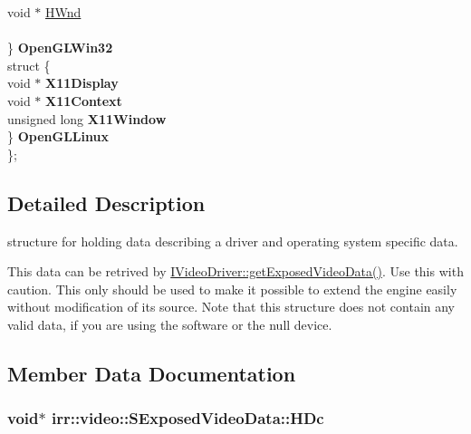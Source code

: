 \begin{DoxyCompactItemize}
\begin{tabbing}
\>\>void $\ast$ \hyperlink{structirr_1_1video_1_1SExposedVideoData_a1811289f08d71ca61b6b88b765753b88}{HWnd}\\
\>\>\\
\>\} {\bfseries OpenGLWin32}\\
\>struct \{\\
\>\>void $\ast$ {\bfseries X11Display}\\
\>\>void $\ast$ {\bfseries X11Context}\\
\>\>unsigned long {\bfseries X11Window}\\
\>\} {\bfseries OpenGLLinux}\\
\}; \hypertarget{structirr_1_1video_1_1SExposedVideoData_a97c833015b9f592d474a146f2d055d7c}{}\label{structirr_1_1video_1_1SExposedVideoData_a97c833015b9f592d474a146f2d055d7c}
\\

\end{tabbing}\end{DoxyCompactItemize}


\subsection{Detailed Description}
structure for holding data describing a driver and operating system specific data. 

This data can be retrived by \hyperlink{classirr_1_1video_1_1IVideoDriver_a4f3535b2125e654e2e9645745e50cc49}{I\+Video\+Driver\+::get\+Exposed\+Video\+Data()}. Use this with caution. This only should be used to make it possible to extend the engine easily without modification of its source. Note that this structure does not contain any valid data, if you are using the software or the null device. 

\subsection{Member Data Documentation}
\subsubsection[{\texorpdfstring{H\+Dc}{HDc}}]{\setlength{\rightskip}{0pt plus 5cm}void$\ast$ irr\+::video\+::\+S\+Exposed\+Video\+Data\+::\+H\+Dc}\hypertarget{structirr_1_1video_1_1SExposedVideoData_ad7c4d919a8c0e17ee46577fcc69fe8e6}{}\label{structirr_1_1video_1_1SExposedVideoData_ad7c4d919a8c0e17ee46577fcc69fe8e6}


